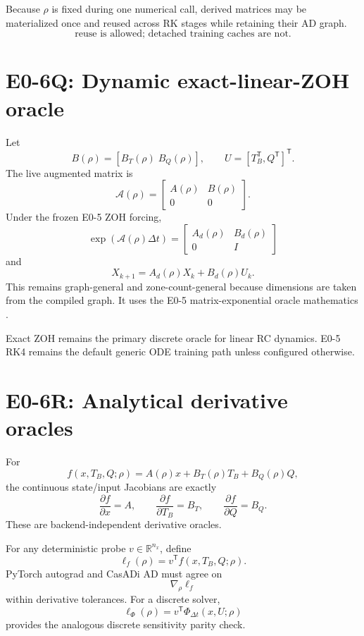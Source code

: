 \documentclass[11pt]{article}
\newcommand{\R}{\mathbb{R}}
\begin{document}
Because $\rho$ is fixed during one numerical call, derived matrices may be
materialized once and reused across RK stages while retaining their AD graph.
\[
\boxed{\text{reuse is allowed; detached training caches are not}.}
\]

\section{E0-6Q: Dynamic exact-linear-ZOH oracle}

Let
\[
B(\rho)=[B_T(\rho)\;B_Q(\rho)],\qquad
U=[T_B^{\mathsf T},Q^{\mathsf T}]^{\mathsf T}.
\]
The live augmented matrix is
\[
\mathcal A(\rho)=
\begin{bmatrix}
A(\rho)&B(\rho)\\
0&0
\end{bmatrix}.
\]
Under the frozen E0-5 ZOH forcing,
\[
\boxed{
\exp(\mathcal A(\rho)\Delta t)=
\begin{bmatrix}
A_d(\rho)&B_d(\rho)\\
0&I
\end{bmatrix}
}
\]
and
\[
\boxed{X_{k+1}=A_d(\rho)X_k+B_d(\rho)U_k.}
\]
This remains graph-general and zone-count-general because dimensions are taken
from the compiled graph. It uses the E0-5 matrix-exponential oracle mathematics
\cite{Higham2009MatrixExponential,VanLoan1978MatrixExponentialIntegrals}.

Exact ZOH remains the primary discrete oracle for linear RC dynamics. E0-5 RK4
remains the default generic ODE training path unless configured otherwise.

\section{E0-6R: Analytical derivative oracles}

For
\[
f(x,T_B,Q;\rho)=A(\rho)x+B_T(\rho)T_B+B_Q(\rho)Q,
\]
the continuous state/input Jacobians are exactly
\[
\boxed{\frac{\partial f}{\partial x}=A},
\qquad
\boxed{\frac{\partial f}{\partial T_B}=B_T},
\qquad
\boxed{\frac{\partial f}{\partial Q}=B_Q}.
\]
These are backend-independent derivative oracles.

For any deterministic probe $v\in\R^{n_x}$, define
\[
\ell_f(\rho)=v^{\mathsf T}f(x,T_B,Q;\rho).
\]
PyTorch autograd and CasADi AD must agree on
\[
\boxed{\nabla_\rho\ell_f}
\]
within derivative tolerances. For a discrete solver,
\[
\ell_\Phi(\rho)=v^{\mathsf T}\Phi_{\Delta t}(x,U;\rho)
\]
provides the analogous discrete sensitivity parity check.
\end{document}
